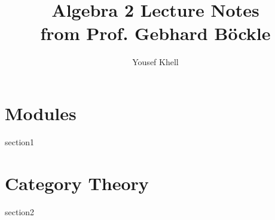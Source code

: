 \documentclass[a4paper]{report}
\title{\vspace{-2cm} Algebra 2 Lecture Notes\\from Prof. Gebhard Böckle}
\author{Yousef Khell}
\begin{document}
\maketitle

\chapter{Modules}
{section1}
\chapter{Category Theory}
{section2}
\end{document}
